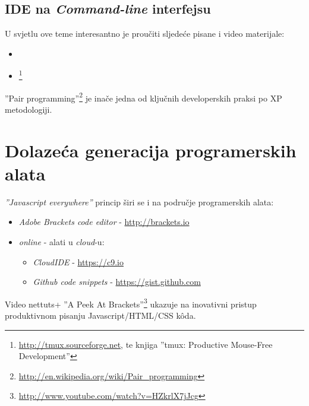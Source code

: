 \documentclass[times, utf8, seminar]{fit}
\begin{document}
\subsection{IDE na \emph{Command-line} interfejsu}

U svjetlu ove teme interesantno je proučiti sljedeće pisane i video materijale:
\begin{itemize}
 \item  \href{http://blog.sanctum.geek.nz/series/unix-as-ide}{\color{blue}{Unix kao IDE}}
 \item \href{http://www.youtube.com/watch?v=za8FMIWYtUc}{}\footnote{\url{http://tmux.sourceforge.net}, te knjiga ''tmux: Productive Mouse-Free Development''\citep{pragtmux}}
\end{itemize}

''Pair programming''\footnote{\url{http://en.wikipedia.org/wiki/Pair_programming}} je inače  jedna od ključnih developerskih praksi po XP metodologiji\citep{agileart}.

\section{Dolazeća generacija programerskih alata}

\emph{''Javascript everywhere''} princip širi se i na područje programerskih alata:
\begin{itemize}
   \item \emph{Adobe Brackets code editor} - \url{http://brackets.io}
   \item \emph{online} - alati u \emph{cloud}-u:
   \begin{itemize}
     \item \emph{CloudIDE} - \url{https://c9.io}
     \item \emph{Github code snippets} - \url{https://gist.github.com}
   \end{itemize}
\end{itemize}

Video nettuts+ ''A Peek At Brackets''\footnote{\url{http://www.youtube.com/watch?v=HZkrlX7jJcg}} ukazuje na inovativni pristup produktivnom pisanju Javascript/HTML/CSS k\^oda.
\end{document}
